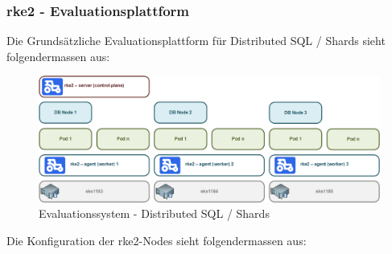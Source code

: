 
\begin{flushleft}
    \subsubsection{rke2 - Evaluationsplattform}
    Die Grundsätzliche Evaluationsplattform für Distributed SQL / Shards sieht folgendermassen aus:
    \begin{figure}[H]
        \centering
        \includegraphics[width=0.8\linewidth]{source/implementation/evaluation/platforms/evaluation_enviroment_rke2}
        \caption{Evaluationssystem - Distributed SQL / Shards}
        \label{fig:evaluation_enviroment_rke2}
    \end{figure}
    
    Die Konfiguration der \gls{rke2}-Nodes sieht folgendermassen aus:
    
    
\end{flushleft}
